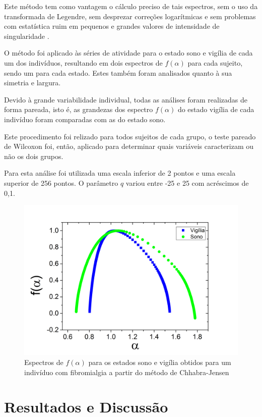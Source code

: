 \documentclass{ufscThesis}
\begin{document}
Este método tem como vantagem o cálculo preciso de tais espectros, sem o uso da transformada de Legendre, sem desprezar correções logarítmicas e sem problemas com estatística ruim em pequenos e grandes valores de intensidade de singularidade \cite{Chhabra1989}. \par
O método foi aplicado às séries de atividade para o estado sono e vigília de cada um dos indivíduos, resultando em dois espectros de $f(\alpha)$ para cada sujeito, sendo um para cada estado. Estes também foram analisados quanto à sua simetria e largura. \par
Devido à grande variabilidade individual, todas as análises foram realizadas de forma pareada, isto é, as grandezas dos espectro $f(\alpha)$ do estado vigília de cada indivíduo foram comparadas com as do estado sono. \par
Este procedimento foi relizado para todos sujeitos de cada grupo, o teste pareado de Wilcoxon foi, então, aplicado para determinar quais variáveis caracterizam ou não os dois grupos. \par
Para esta análise foi utilizada uma escala inferior de 2 pontos e uma escala superior de 256 pontos. O parâmetro $q$ variou entre -25 e 25 com acréscimos de 0,1.

\begin{figure}[!h]
\centering
\includegraphics[scale=0.3]{spectr_chhabra.png}
\caption{Espectros de $f(\alpha)$ para os estados sono e vigília obtidos para um indivíduo com fibromialgia a partir do método de Chhabra-Jensen}
\label{chhabra_fibromialgia}
\end{figure}


\chapter{Resultados e Discussão}
\end{document}
